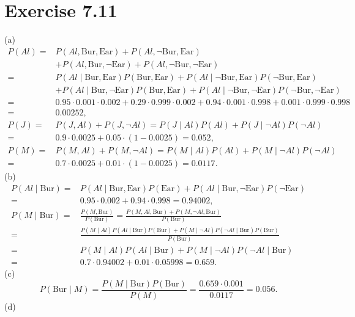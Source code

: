 \documentclass[10pt]{book}
\begin{document}
\section{Exercise 7.11}
(a)
\[
\begin{aligned}
P(Al)= & P(Al, \text{Bur}, \text{Ear})+P(Al, \neg \text{Bur}, \text{Ear}) \\
& +P(Al, \text{Bur}, \neg \text{Ear})+P(Al, \neg \text{Bur}, \neg \text{Ear}) \\
= & P(Al \mid \text{Bur}, \text{Ear}) P(\text{Bur}, \text{Ear})+P(Al \mid \neg \text{Bur}, \text{Ear}) P(\neg \text{Bur}, \text{Ear}) \\
& +P(Al \mid \text{Bur}, \neg \text{Ear}) P(\text{Bur}, \text{Ear}) +P(Al \mid \neg \text{Bur}, \neg \text{Ear}) P(\neg \text{Bur}, \neg \text{Ear}) \\
= & 0.95 \cdot 0.001 \cdot 0.002+0.29 \cdot 0.999 \cdot 0.002+0.94 \cdot 0.001 \cdot 0.998 +0.001 \cdot 0.999 \cdot 0.998 \\
= & 0.00252, \\
P(J)= & P(J, Al)+P(J, \neg Al)=P(J \mid Al) P(Al)+P(J \mid \neg Al) P(\neg Al) \\
= & 0.9 \cdot 0.0025+0.05 \cdot(1-0.0025)=0.052, \\
P(M)= & P(M, Al)+P(M, \neg Al)=P(M \mid Al) P(Al)+P(M \mid \neg Al) P(\neg Al) \\
= & 0.7 \cdot 0.0025+0.01 \cdot(1-0.0025)=0.0117.
\end{aligned}
\]
(b)
\[
\begin{aligned}
P(Al \mid \text{Bur})= & P(Al \mid \text{Bur}, \text{Ear}) P(\text{Ear})+P(Al \mid \text{Bur}, \neg \text{Ear}) P(\neg \text{Ear}) \\
= & 0.95 \cdot 0.002+0.94 \cdot 0.998=0.94002, \\
P(M \mid \text{Bur})= & \frac{P(M, \text{Bur})}{P(\text{Bur})}=\frac{P(M, Al, \text{Bur})+P(M, \neg Al, \text{Bur})}{P(\text{Bur})} \\
= & \frac{P(M \mid Al) P(Al \mid \text{Bur}) P(\text{Bur})+P(M \mid \neg Al) P(\neg Al \mid \text{Bur}) P(\text{Bur})}{P(\text{Bur})} \\
= & P(M \mid Al) P(Al \mid \text{Bur})+P(M \mid \neg Al) P(\neg Al \mid \text{Bur}) \\
= & 0.7 \cdot 0.94002+0.01 \cdot 0.05998=0.659.
\end{aligned}
\]
(c)
\[
P(\text{Bur} \mid M)=\frac{P(M \mid \text{Bur}) P(\text{Bur})}{P(M)}=\frac{0.659 \cdot 0.001}{0.0117}=0.056.
\]
(d)
\end{document}
